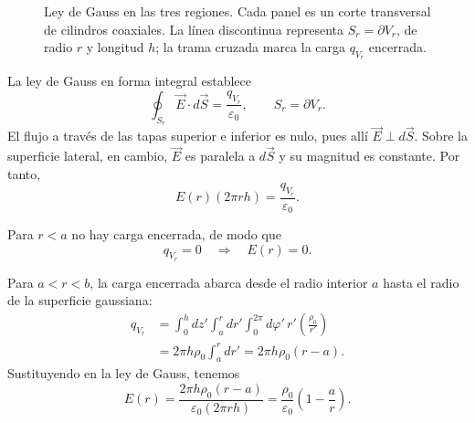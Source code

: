 \documentclass[11pt]{article}
\begin{document}
\begin{figure}[htbp]
\caption{Ley de Gauss en las tres regiones. Cada panel es un corte transversal
de cilindros coaxiales. La línea discontinua representa $S_r=\partial V_r$, de
radio $r$ y longitud $h$; la trama cruzada marca la carga $q_{V_r}$ encerrada.}
\label{fig:gauss}
\end{figure}

La ley de Gauss en forma integral establece
\begin{equation}
\oint_{S_r}\vec E\cdot d\vec S
=\frac{q_{V_r}}{\varepsilon_0},
\qquad S_r=\partial V_r.
\end{equation}
El flujo a través de las tapas superior e inferior es nulo, pues allí
$\vec E\perp d\vec S$. Sobre la superficie lateral, en cambio, $\vec E$ es
paralela a $d\vec S$ y su magnitud es constante. Por tanto,
\begin{equation}
E(r)(2\pi r h)=\frac{q_{V_r}}{\varepsilon_0}.
\end{equation}

Para $r<a$ no hay carga encerrada, de modo que
\begin{equation}
q_{V_r}=0
\quad\Longrightarrow\quad E(r)=0.
\end{equation}

Para $a<r<b$, la carga encerrada abarca desde el radio interior $a$ hasta el
radio de la superficie gaussiana:
\begin{equation}
\begin{aligned}
q_{V_r}
&=\int_0^h dz'\int_a^r dr'\int_0^{2\pi}d\varphi'\,
  r'\left(\frac{\rho_0}{r'}\right)\\
&=2\pi h\rho_0\int_a^r dr'
 =2\pi h\rho_0(r-a).
\end{aligned}
\end{equation}
Sustituyendo en la ley de Gauss, tenemos
\begin{equation}
E(r)=\frac{2\pi h\rho_0(r-a)}
{\varepsilon_0(2\pi r h)}
=\frac{\rho_0}{\varepsilon_0}\left(1-\frac{a}{r}\right).
\end{equation}
\end{document}
